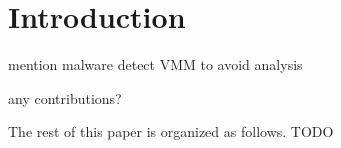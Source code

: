 \section{Introduction}
\label{sec:introduction}

mention malware detect VMM to avoid analysis

any contributions?

The rest of this paper is organized as follows. TODO